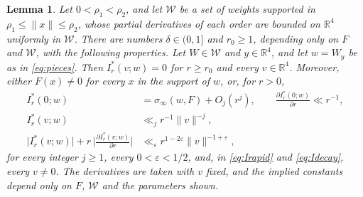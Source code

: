 \documentclass[11pt]{amsart}
\numberwithin{equation}{section}
\numberwithin{figure}{section}
\newtheorem{lemma}{Lemma}[section]
\theoremstyle{definition}
\newcommand{\R}{\mathbb{R}}
\newcommand{\eps}{\varepsilon}
\newcommand{\abs}[1]{\lvert #1\rvert}
\begin{document}
\begin{lemma}\label{lem:integrals}
Let $0<\rho_1<\rho_2$, and let $\mathcal W$ be a set of weights
supported in $\rho_1\le\lVert x\rVert\le\rho_2$, whose partial
derivatives of each order are bounded on $\R^4$ uniformly in
$\mathcal W$. There are numbers $\delta\in(0,1]$ and $r_0\ge1$,
depending only on $F$ and $\mathcal W$, with the following
properties. Let $W\in\mathcal W$ and $y\in\R^4$, and let $w=W_y$ be
as in \eqref{eq:pieces}. Then $I_r^*(v;w)=0$ for $r\ge r_0$ and every
$v\in\R^4$. Moreover, either $F(x)\ne0$ for every $x$ in the support
of $w$, or, for $r>0$,
\begin{align}
 I_r^*(0;w)&=\sigma_\infty(w,F)+O_j(r^j),
 \qquad\frac{\partial I_r^*(0;w)}{\partial r}\ll r^{-1},\label{eq:Izero}\\
 I_r^*(v;w)&\ll_jr^{-1}\lVert v\rVert^{-j},\label{eq:Irapid}\\
 \abs{I_r^*(v;w)}+r\,\bigg|\frac{\partial I_r^*(v;w)}{\partial r}\bigg|
 &\ll_\eps r^{1-2\eps}\lVert v\rVert^{-1+\eps},\label{eq:Idecay}
\end{align}
for every integer $j\ge1$, every $0<\eps<1/2$, and, in
\eqref{eq:Irapid} and \eqref{eq:Idecay}, every $v\ne0$. The
derivatives are taken with $v$ fixed, and the implied constants
depend only on $F$, $\mathcal W$ and the parameters shown.
\end{lemma}
\end{document}
